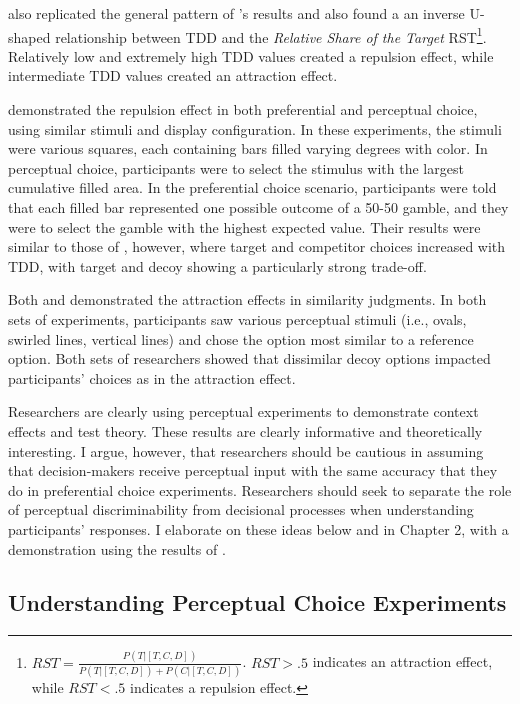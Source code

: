 \textcite{liaoInfluenceDistanceDecoy2021} also replicated the general pattern of \textcite{spektorWhenGoodLooks2018b}'s results and also found a an inverse U-shaped relationship between TDD and the \textit{Relative Share of the Target} RST\footnote{$RST=\frac{P(T|[T,C,D])}{P(T|[T,C,D])+P(C|[T,C,D])}$. $RST>.5$ indicates an attraction effect, while $RST<.5$ indicates a repulsion effect.}. Relatively low and extremely high TDD values created a repulsion effect, while intermediate TDD values created an attraction effect. 

\textcite{spektorRepulsionEffectPreferential2022} demonstrated the repulsion effect in both preferential and perceptual choice, using similar stimuli and display configuration. In these experiments, the stimuli were various squares, each containing bars filled varying degrees with color. In perceptual choice, participants were to select the stimulus with the largest cumulative filled area. In the preferential choice scenario, participants were told that each filled bar represented one possible outcome of a 50-50 gamble, and they were to select the gamble with the highest expected value. Their results were similar to those of \textcite{spektorWhenGoodLooks2018b}, however, where target and competitor choices increased with TDD, with target and decoy showing a particularly strong trade-off.

Both \textcite{choplinComparisoninducedDecoyEffects2005b} and \textcite{yearsleyContextEffectsSimilarity2022} demonstrated the attraction effects in similarity judgments. In both sets of experiments, participants saw various perceptual stimuli (i.e., ovals, swirled lines, vertical lines) and chose the option most similar to a reference option. Both sets of researchers showed that dissimilar decoy options impacted participants' choices as in the attraction effect.

Researchers are clearly using perceptual experiments to demonstrate context effects and test theory. These results are clearly informative and theoretically interesting. I argue, however, that researchers should be cautious in assuming that decision-makers receive perceptual input with the same accuracy that they do in preferential choice experiments. Researchers should seek to separate the role of perceptual discriminability from decisional processes when understanding participants' responses. I elaborate on these ideas below and in Chapter 2, with a demonstration using the results of \textcite{spektorWhenGoodLooks2018b}.

\subsection{Understanding Perceptual Choice Experiments}

